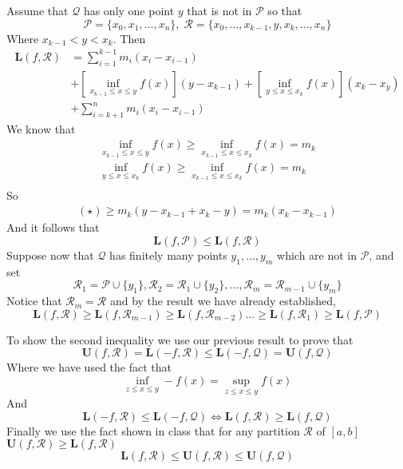 \documentclass[11pt]{article}
\newcommand{\Par}{\mathcal{P}}
\newcommand{\aR}{\mathcal{R}}
\newcommand{\Qu}{\mathcal{Q}}
\newcommand{\Lo}{\mathbf{L}}
\newcommand{\U}{\mathbf{U}}
\begin{document}
    Assume that $\Qu$ has only one point $y$ that is not in $\Par$ so that
    \[
        \Par = \{ x_0, x_1, \hdots, x_n \}, \; \aR = \{ x_0, \hdots, x_{k-1}, y, x_k, \hdots, x_n \}
    \]
    Where $x_{k-1} < y < x_k$.
    Then
    \begin{align*}
        \Lo (f, \aR) &= \sum_{i=1}^{k-1} m_i (x_{i} - x_{i-1})  \\
        &+ \left[ \inf_{x_{k-1} \leq x \leq y} f(x) \right] (y - x_{k-1}) + \left[ \inf_{y \leq x \leq x_k} f(x) \right] (x_k - x_y) \tag{$\star$} \\
        &+ \sum_{i=k+1}^{n} m_i (x_{i} - x_{i-1})
    \end{align*}
    We know that
    \begin{align*}
        \inf_{x_{k-1} \leq x \leq y} f(x) \geq \inf_{x_{k-1} \leq x \leq x_k} f(x) = m_k \\
        \inf_{y \leq x \leq x_k} f(x) \geq \inf_{x_{k-1} \leq x \leq x_k} f(x) = m_k \\
    \end{align*}
    So
    \begin{align*}
    (\star)
        \geq m_k (y - x_{k-1} + x_k - y) =  m_k (x_k - x_{k-1})
    \end{align*}
    And it follows that
    \[
        \Lo (f, \Par) \leq \Lo (f, \aR)
    \]
    Suppose now that $\Qu$ has finitely many points $y_1, \hdots, y_m$ which are not in $\Par$, and set
    \[
        \aR_1 = \Par \cup \{ y_1 \}, \aR_2 = \aR_1 \cup \{ y_2 \}, \hdots , \aR_m = \aR_{m-1} \cup \{ y_m \}
    \]
    Notice that $\aR_m = \aR$ and by the result we have already established,
    \[
        \Lo (f, \aR) \geq \Lo (f, \aR_{m-1}) \geq \Lo (f, \aR_{m-2}) \hdots \geq \Lo (f, \aR_1) \geq \Lo (f, \Par)
    \]

    To show the second inequality we use our previous result to prove that
    \[
        \U (f, \aR) = \Lo (-f, \aR) \leq \Lo(-f, \Qu) = \U (f, \Qu)
    \]
    Where we have used the fact that
    \[
        \inf_{z \leq x \leq y} -f(x) = \sup_{z \leq x \leq y} f(x)
    \]
    And
    \[
        \Lo (-f, \aR) \leq \Lo(-f, \Qu) \iff \Lo (f, \aR) \geq \Lo(f, \Qu)
    \]
    Finally we use the fact shown in class that for any partition $\aR$ of $[a,b]$ $\U (f, \aR) \geq \Lo (f, \aR)$
    \[
        \Lo (f, \aR) \leq \U(f, \aR) \leq \U (f, \Qu)
    \]
\end{document}
